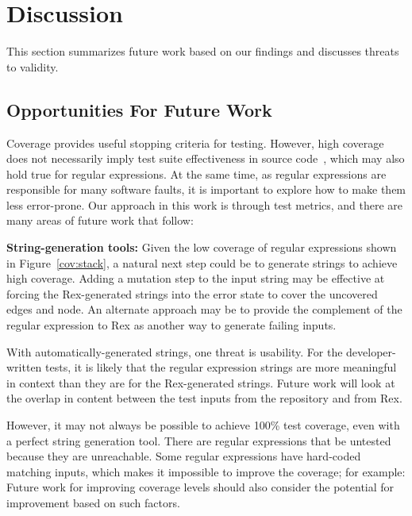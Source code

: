 \section{Discussion}
\label{sec:discussion}
This section summarizes future work based on our findings and discusses threats to validity.
\subsection{Opportunities For Future Work}
Coverage provides useful stopping criteria for testing. 
However, high coverage does not necessarily imply test suite effectiveness in source code~\cite{coveragetestsuitecorrelation}, which may also hold true for regular expressions. 
At the same time, as regular expressions are responsible for many software faults, it is important to explore how to make them less error-prone. Our approach in this work is through test metrics, and there are many areas of future work that follow:

\textbf{String-generation tools: } 
Given the low coverage of regular expressions shown in Figure~\ref{cov:stack}, a natural next step could be to generate strings to achieve high coverage. 
Adding a mutation step to the input string may be effective at forcing the Rex-generated strings into the error state to cover the uncovered edges and node. An alternate approach may be to provide the complement of the regular expression to Rex as another way to generate failing inputs. 

With automatically-generated strings, one threat is usability. For the developer-written tests, it is likely that the regular expression strings are more meaningful in context than they are for the Rex-generated strings. Future work will look at the overlap in content between the test inputs from the repository and from Rex. 

However, it may not always be possible to achieve 100\% test coverage, even with a perfect string generation tool. There are regular expressions that be untested because they are unreachable. Some regular expressions have hard-coded matching inputs, which makes it impossible to improve the coverage; for example: 
Future work for improving coverage levels should also consider the potential for improvement based on such factors. 

